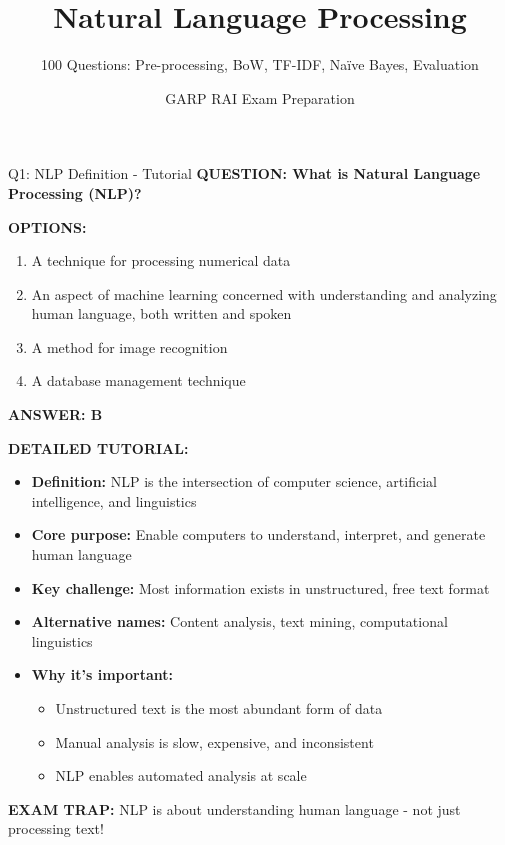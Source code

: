 \documentclass[8pt]{beamer}
\title{Natural Language Processing}
\subtitle{100 Questions: Pre-processing, BoW, TF-IDF, Naïve Bayes, Evaluation}
\author{GARP RAI Exam Preparation}
\date{}
\begin{document}
	
	\begin{frame}
		\titlepage
	\end{frame}
	
	
	\begin{frame}{Q1: NLP Definition - Tutorial}
		\fontsize{6.5}{7.5}\selectfont
		\textbf{QUESTION: What is Natural Language Processing (NLP)?}
		
		\vspace{0.1cm}
		\textbf{OPTIONS:}
		\begin{enumerate}
			\item A technique for processing numerical data
			\item An aspect of machine learning concerned with understanding and analyzing human language, both written and spoken
			\item A method for image recognition
			\item A database management technique
		\end{enumerate}
		
		\vspace{0.1cm}
		\textcolor{myblue}{\textbf{ANSWER: B}}
		
		\vspace{0.1cm}
		\textbf{DETAILED TUTORIAL:}
		\begin{itemize}
			\item \textbf{Definition:} NLP is the intersection of computer science, artificial intelligence, and linguistics
			\item \textbf{Core purpose:} Enable computers to understand, interpret, and generate human language
			\item \textbf{Key challenge:} Most information exists in unstructured, free text format
			\item \textbf{Alternative names:} Content analysis, text mining, computational linguistics
			\item \textbf{Why it's important:}
			\begin{itemize}
				\item Unstructured text is the most abundant form of data
				\item Manual analysis is slow, expensive, and inconsistent
				\item NLP enables automated analysis at scale
			\end{itemize}
		\end{itemize}
		
		\textcolor{myred}{\textbf{EXAM TRAP:}} NLP is about \textcolor{myblue}{understanding human language} - not just processing text!
	\end{frame}
	
\end{document}
